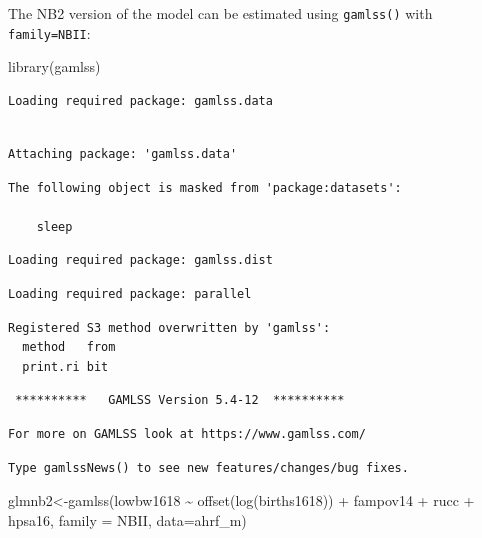 \documentclass[
  letterpaper,
  DIV=11,
  numbers=noendperiod]{scrreprt}
\newenvironment{Shaded}{\begin{snugshade}}{\end{snugshade}}
\newcommand{\AttributeTok}[1]{\textcolor[rgb]{0.40,0.45,0.13}{#1}}
\newcommand{\FunctionTok}[1]{\textcolor[rgb]{0.28,0.35,0.67}{#1}}
\newcommand{\NormalTok}[1]{\textcolor[rgb]{0.00,0.23,0.31}{#1}}
\newcommand{\OtherTok}[1]{\textcolor[rgb]{0.00,0.23,0.31}{#1}}
\newcommand{\SpecialCharTok}[1]{\textcolor[rgb]{0.37,0.37,0.37}{#1}}
\begin{document}
The NB2 version of the model can be estimated using \texttt{gamlss()}
with \texttt{family=NBII}:

\begin{Shaded}
\begin{Highlighting}[]
\FunctionTok{library}\NormalTok{(gamlss)}
\end{Highlighting}
\end{Shaded}

\begin{verbatim}
Loading required package: gamlss.data
\end{verbatim}

\begin{verbatim}

Attaching package: 'gamlss.data'
\end{verbatim}

\begin{verbatim}
The following object is masked from 'package:datasets':

    sleep
\end{verbatim}

\begin{verbatim}
Loading required package: gamlss.dist
\end{verbatim}

\begin{verbatim}
Loading required package: parallel
\end{verbatim}

\begin{verbatim}
Registered S3 method overwritten by 'gamlss':
  method   from
  print.ri bit 
\end{verbatim}

\begin{verbatim}
 **********   GAMLSS Version 5.4-12  ********** 
\end{verbatim}

\begin{verbatim}
For more on GAMLSS look at https://www.gamlss.com/
\end{verbatim}

\begin{verbatim}
Type gamlssNews() to see new features/changes/bug fixes.
\end{verbatim}

\begin{Shaded}
\begin{Highlighting}[]
\NormalTok{glmnb2}\OtherTok{\textless{}{-}}\FunctionTok{gamlss}\NormalTok{(lowbw1618 }\SpecialCharTok{\textasciitilde{}} \FunctionTok{offset}\NormalTok{(}\FunctionTok{log}\NormalTok{(births1618)) }\SpecialCharTok{+}\NormalTok{ fampov14 }\SpecialCharTok{+}\NormalTok{ rucc }\SpecialCharTok{+}\NormalTok{ hpsa16,}
               \AttributeTok{family =}\NormalTok{ NBII,}
               \AttributeTok{data=}\NormalTok{ahrf\_m)}
\end{Highlighting}
\end{Shaded}
\end{document}
